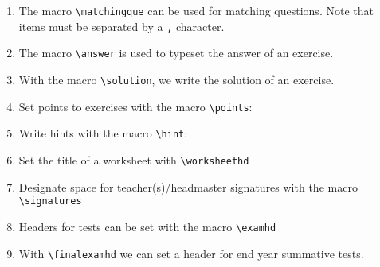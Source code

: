 \documentclass[12pt,a4page]{article}
\def\cellwidth{0.4\textwidth}
\newcommand{\miniexample}[3][t]{%
  \parbox[#1][#3][t]{\cellwidth}{#2}
}
\newcommand{\codeexample}[3][c]{%
  \colorbox[HTML]{b0c4be}{\miniexample[#1]{}{#3}}
}
\newcommand{\textexample}[3][c]{%
  {\footnotesize
    \colorbox[gray]{0.9}{\miniexample[#1]{}{#3}}%
  }
}
\newcommand{\examplerow}[3][10pt]{%
  \par\noindent\strut\hfill\codeexample{#2}{#3}\hspace{#1}\textexample{#2}{#3}\hfill\strut
}
\newlength{\exheight}
\begin{document}
\begin{enumerate}
\item The macro \verb|\matchingque| can be used for matching questions. Note that items must be
  separated by a \verb|,| character.
  \setlength{\exheight}{117pt}
  \setlength{\leftmatchwidth}{10em}
  \setlength{\rightmatchwidth}{10em}
  \examplerow{exampleMacroMatchingque.tex}{\exheight}
\item The macro \verb/\answer/ is used to typeset the answer of an exercise.
  \setlength{\exheight}{49pt}
  \examplerow{exampleMacroAnswer.tex}{\exheight}
\item With the macro \verb|\solution|, we write the solution of an exercise.
  \setlength{\exheight}{98pt}
  \examplerow{exampleMacroSolution.tex}{\exheight}
\item Set points to exercises with the macro \verb|\points|:
  \setlength{\exheight}{169pt}
  \examplerow{exampleMacroPoints.tex}{\exheight}

\item Write hints with the macro \verb|\hint|:
  \setlength{\exheight}{180pt}
  \examplerow{exampleMacroHint.tex}{\exheight}
\item Set the title of a worksheet with \verb|\worksheethd|
  \setlength{\exheight}{70pt}
  \examplerow{exampleMacroWorksheethd.tex}{\exheight}
\item Designate space for teacher(s)/headmaster signatures with the macro
  \verb|\signatures|
  \setlength{\exheight}{72pt}
  \setlength{\signatureslength}{80pt}
  \setlength{\signaturelineskip}{25pt}
  \examplerow{exampleMacroSignatures.tex}{\exheight}
\item Headers for tests can be set with the macro \verb|\examhd|
  \setlength{\exheight}{67pt}
  \examplerow{exampleMacroExamhd.tex}{\exheight}
\item With \verb|\finalexamhd| we can set a header for end year summative tests.
  \setlength{\exheight}{39pt}
  \examplerow{exampleMacroFinalExamhd.tex}{\exheight}


\end{enumerate}
\end{document}
